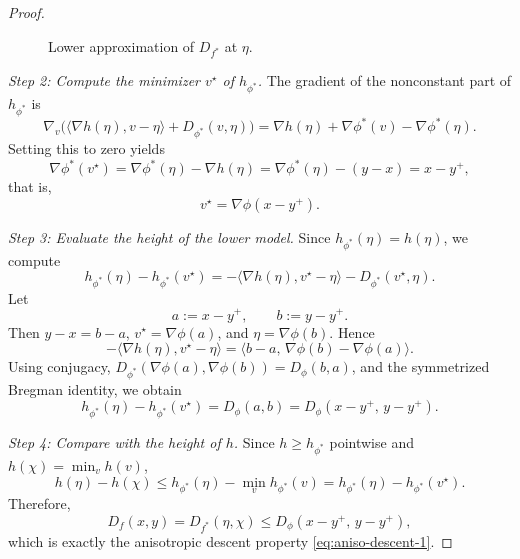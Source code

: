 \documentclass[10pt,a4paper]{amsart}
\providecommand{\paragraph}{}
\begin{document}
\begin{proof}
\begin{figure}[htbp]
\begin{center}

\caption{Lower approximation of $D_{f^*}$ at $\eta$.}
\label{fig:Dflower}
\end{center}
\end{figure}

\paragraph{\em Step 2: Compute the minimizer $v^\star$ of $h_{\phi^*}$.}
The gradient of the nonconstant part of $h_{\phi^*}$ is
\[
\nabla_v\Big(\langle \nabla h(\eta),v-\eta\rangle + D_{\phi^*}(v,\eta)\Big)
= \nabla h(\eta)+\nabla\phi^*(v)-\nabla\phi^*(\eta).
\]
Setting this to zero yields
\begin{equation}\label{eq:vstar}
\nabla\phi^*(v^\star)
= \nabla\phi^*(\eta)-\nabla h(\eta)
= \nabla\phi^*(\eta)-(y-x)=x-y^+,
\end{equation}
that is,
\[
v^\star=\nabla\phi(x-y^+).
\]

\paragraph{\em Step 3: Evaluate the height of the lower model.}
Since $h_{\phi^*}(\eta)=h(\eta)$, we compute
\[
h_{\phi^*}(\eta)-h_{\phi^*}(v^\star)
= -\langle \nabla h(\eta),v^\star-\eta\rangle - D_{\phi^*}(v^\star,\eta).
\]
Let
\[
a:=x-y^+,\qquad b:=y-y^+.
\]
Then $y-x=b-a$, $v^\star=\nabla\phi(a)$, and $\eta=\nabla\phi(b)$. Hence
\[
-\langle \nabla h(\eta),v^\star-\eta\rangle
= \langle b-a,\,\nabla\phi(b)-\nabla\phi(a)\rangle.
\]
Using conjugacy,
$D_{\phi^*}(\nabla\phi(a),\nabla\phi(b))=D_\phi(b,a)$, and the symmetrized
Bregman identity, we obtain
\begin{equation}\label{eq:height-phi}
h_{\phi^*}(\eta)-h_{\phi^*}(v^\star)
= D_\phi(a,b)
= D_\phi(x-y^+,\,y-y^+).
\end{equation}

\paragraph{\em Step 4: Compare with the height of $h$.}
Since $h\ge h_{\phi^*}$ pointwise and $h(\chi)=\min_v h(v)$,
\[
h(\eta)-h(\chi)
\le h_{\phi^*}(\eta)-\min_v h_{\phi^*}(v)
= h_{\phi^*}(\eta)-h_{\phi^*}(v^\star).
\]
Therefore,
\[
D_f(x,y)
= D_{f^*}(\eta,\chi)
\le D_\phi(x-y^+,\,y-y^+),
\]
which is exactly the anisotropic descent property \eqref{eq:aniso-descent-1}.

\end{proof}
\end{document}
